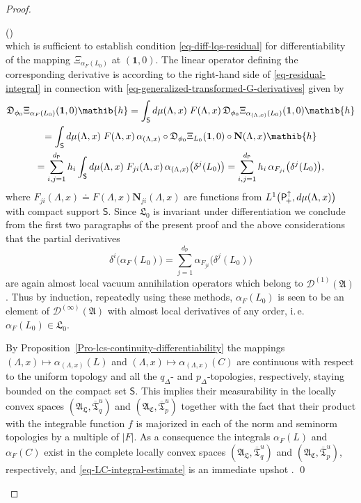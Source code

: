 \documentclass[11pt,twoside,openright]{report}
\theoremstyle{definition}
\theoremstyle{plain}
\theoremstyle{remark}
\theoremstyle{assumption}
\newcommand{\abs}[1]{\lvert #1 \rvert}
\newcommand{\pD}{p_\Delta}
\newcommand{\qD}{q_\Delta}
\newcommand{\Nbf}{\mathbf{N}}
\newcommand{\Afrak}{\mathfrak{A}}
\newcommand{\Dfrak}{\mathfrak{D}}
\newcommand{\Lfrak}{\mathfrak{L}}
\newcommand{\hib}{\mathib{h}}
\newcommand{\Dscr}{\mathscr{D}}
\newcommand{\Psf}{\mathsf{P}}
\newcommand{\Ssf}{\mathsf{S}}
\newcommand{\unit}{\mathbf{1}}
\newcommand{\Tfrakbar}{\overline{\mathfrak{T}}}
\newcommand{\AC}{\mathfrak{A}_\mathfrak{C}}
\newcommand{\AL}{\mathfrak{A}_\mathfrak{L}}
\newcommand{\Poin}{\mathsf{P}_{\negthinspace +}^\uparrow}
\newcommand{\aLax}{\alpha_{( \Lambda , x )}}
\newcounter{proofitem}
\newenvironment{prooflist}{\begin{list}{(\roman{proofitem})}%
  {\usecounter{proofitem} \setlength{\topsep}{0ex}%
   \setlength{\parsep}{0.2ex} \setlength{\itemsep}{0.4ex}%
   \setlength{\leftmargin}{0em} \setlength{\itemindent}{0.5em}%
   \setlength{\listparindent}{1em}}}{\qed \end{list}}
\begin{document}
\begin{proof}
\begin{prooflist}
\begin{equation}
    \end{equation}
    which is sufficient to establish condition
    \eqref{eq-diff-lqs-residual} for differentiability of the mapping
    $\Xi_{\alpha_F ( L_0 )}$ at $( \unit , 0 )$. The linear operator
    defining the corresponding derivative is according to the
    right-hand side of \eqref{eq-residual-integral} in connection with
    \eqref{eq-generalized-transformed-G-derivatives} given by 
    \begin{multline*}
      \Dfrak_{\phi_0} \Xi_{\alpha_F ( L_0 )} ( \unit , 0 ) \hib =
      \int_\Ssf d \mu ( \Lambda , x ) \; F ( \Lambda , x ) \,
      \Dfrak_{\phi_0} \Xi_{\aLax ( L_0 )} ( \unit , 0 ) \hib \\ 
      = \int_\Ssf d \mu ( \Lambda , x ) \; F ( \Lambda , x ) \, \aLax
      \circ \Dfrak_{\phi_0} \Xi_{L_0} ( \unit , 0 ) \circ \Nbf (
      \Lambda , x ) \hib \\
      = \sum_{i , j = 1}^{d_\Psf} h_i \int_\Ssf d \mu ( \Lambda , x )
      \; F_{j i} ( \Lambda , x ) \, \aLax \bigl( \delta^j ( L_0 )
      \bigr) = \sum_{i , j = 1}^{d_\Psf} h_i \, \alpha_{F_{j i}}
      \bigl( \delta^j ( L_0 ) \bigr) \text{,}
    \end{multline*}
    where $F_{j i} ( \Lambda , x ) \doteq F ( \Lambda , x ) \Nbf_{j i}
    ( \Lambda , x )$ are functions from $L^1 \bigl( \Poin , d \mu (
    \Lambda , x ) \bigr)$ with compact support $\Ssf$. Since
    $\Lfrak_0$ is invariant under differentiation we conclude from the
    first two paragraphs of the present proof and the above
    considerations that the partial derivatives
    \begin{equation*}
      \delta^i \bigl( \alpha_F ( L_0 ) \bigr) = \sum_{j = 1}^{d_\Psf}
      \alpha_{F_{j i}} \bigl( \delta^j ( L_0 ) \bigr)
    \end{equation*}
    are again almost local vacuum annihilation operators which belong
    to $\Dscr^{( 1 )} ( \Afrak )$. Thus by induction, repeatedly using
    these methods, $\alpha_F ( L_0 )$ is seen to be an element of
    $\Dscr^{( \infty )} ( \Afrak )$ with almost local derivatives of
    any order, i.\,e. $\alpha_F ( L_0 ) \in \Lfrak_0$.
  \item By Proposition~\ref{Pro-lcs-continuity-differentiability} the
    mappings $( \Lambda , x ) \mapsto \aLax ( L )$ and $( \Lambda , x
    ) \mapsto \aLax ( C )$ are continuous with respect to the uniform
    topology and all the $\qD$- and $\pD$-topologies, respectively,
    staying bounded on the compact set $\Ssf$. This implies their
    measurability in the locally convex spaces $( \AL , \Tfrakbar^u_q
    )$ and $( \AC , \Tfrakbar^u_p )$ together with the fact that their
    product with the integrable function $f$ is majorized in each of
    the norm and seminorm topologies by a multiple of $\abs{F}$. As a
    consequence the integrals $\alpha_F ( L )$ and $\alpha_F ( C )$
    exist in the complete locally convex spaces $( \AL ,
    \Tfrakbar^u_q )$ and $( \AC , \Tfrakbar^u_p )$, respectively, and
    \eqref{eq-LC-integral-estimate} is an immediate upshot
    \cite[II.6.2 and 5.4]{fell/doran:1988a}.
  \end{prooflist}
  \renewcommand{\qed}{}
\end{proof}
\end{document}
